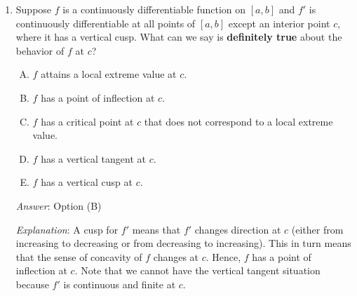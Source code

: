 \documentclass[10pt]{amsart}
\begin{document}
\begin{enumerate}
  {\em Apologies, the language of option (E) was confusing. Although
  the question did say ``eventually'', option (E) should ideally have
  read ``$f$ may be eventually concave up, concave down, or neither''
  rather than forcing you to infer this from the context.}

  {\em Answer}: Option (C).

  {\em Explanation}: Note first that the sign of the leading
  coefficient of $f''$ is the same as the sign of the leading
  coefficient of $f$, because the leading coefficient gets multiplied
  by $n(n-1)$, which is positive for $n \ge 2$. If this sign is
  positive, then $f''(x) \to \infty$ as $x \to \infty$, and hence must
  be eventually positive, forcing $f$ to be eventually concave up. If
  this sign is negative, then $f''(x) \to -\infty$ as $x \to \infty$,
  and hence must be eventually negative, forcing $f$ to be eventually
  concave down.

  {\em Performance review}: $11$ out of $12$ got this correct. $1$
  chose (D).

  {\em Historical note (last year)}: $12$ out of $15$ people got this
  correct. $2$ people chose option (E). This is probably partly
  because of the confusing language, see the apology above.

\item Suppose $f$ is a continuously differentiable function on $[a,b]$
  and $f'$ is continuously differentiable at all points of $[a,b]$
  except an interior point $c$, where it has a vertical cusp. What can
  we say is {\bf definitely true} about the behavior of $f$ at $c$?

  \begin{enumerate}[(A)]
  \item $f$ attains a local extreme value at $c$.
  \item $f$ has a point of inflection at $c$.
  \item $f$ has a critical point at $c$ that does not correspond to a
    local extreme value.
  \item $f$ has a vertical tangent at $c$.
  \item $f$ has a vertical cusp at $c$.
  \end{enumerate}

  {\em Answer}: Option (B)

  {\em Explanation}: A cusp for $f'$ means that $f'$ changes direction
  at $c$ (either from increasing to decreasing or from decreasing to
  increasing). This in turn means that the sense of concavity of $f$
  changes at $c$. Hence, $f$ has a point of inflection at $c$. Note
  that we cannot have the vertical tangent situation because $f'$ is
  continuous and finite at $c$.


\end{enumerate}
\end{document}
